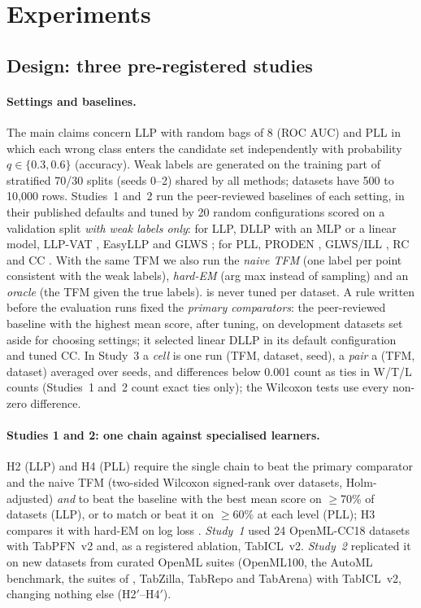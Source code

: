 \section{Experiments}\label{sec:exp}

\subsection{Design: three pre-registered studies}\label{sec:design}
\paragraph{Settings and baselines.} The main claims concern LLP with random bags of 8 (ROC AUC) and PLL in which each
wrong class enters the candidate set independently with probability $q\in\{0.3,0.6\}$ (accuracy). Weak labels are
generated on the training part of stratified 70/30 splits (seeds 0--2) shared by all methods; datasets have 500 to
10{,}000 rows. Studies~1 and~2 run the peer-reviewed baselines of each setting, in their published defaults and tuned
by 20 random configurations scored on a validation split \emph{with weak labels only}: for LLP, DLLP \citep{dllp} with an
MLP or a linear model, LLP-VAT \citep{tsai2020llpvat}, EasyLLP \citep{easy_llp} and GLWS \citep{glws}; for PLL, PRODEN
\citep{proden}, GLWS/ILL \citep{glws,ill}, RC and CC \citep{feng2020provably}. With the same TFM
we also run the \emph{naive TFM} (one label per point consistent with the weak labels), \emph{hard-EM} (arg max instead
of sampling) and an \emph{oracle} (the TFM given the true labels). \ours{} is never tuned per dataset. A rule written before the evaluation runs fixed the
\emph{primary comparators}: the peer-reviewed baseline with the highest mean score, after tuning, on development
datasets set aside for choosing settings; it selected linear DLLP in its default configuration and tuned CC. In Study~3 a \emph{cell} is one run (TFM, dataset, seed), a \emph{pair} a (TFM, dataset)
averaged over seeds, and differences below 0.001 count as ties in W/T/L counts (Studies~1 and~2 count exact ties only);
the Wilcoxon tests use every non-zero difference.

\paragraph{Studies 1 and 2: one chain against specialised learners.} H2 (LLP) and H4 (PLL) require the single chain to
beat the primary comparator and the naive TFM (two-sided Wilcoxon signed-rank over datasets, Holm-adjusted) \emph{and}
to beat the baseline with the best mean score on $\ge$70\% of datasets (LLP), or to match or beat it on $\ge$60\% at each
level (PLL); H3 compares it with hard-EM on log loss \citep{benavoli2017bayesian}. \emph{Study~1} used 24 OpenML-CC18
datasets \citep{bischl2021openml} with TabPFN~v2 and, as a registered ablation, TabICL~v2. \emph{Study~2} replicated it
on  new datasets from curated OpenML suites (OpenML100, the AutoML benchmark, the suites of
\citealp{grinsztajn2022tree}, TabZilla, TabRepo and TabArena) with TabICL~v2, changing
nothing else (H2$'$--H4$'$).


